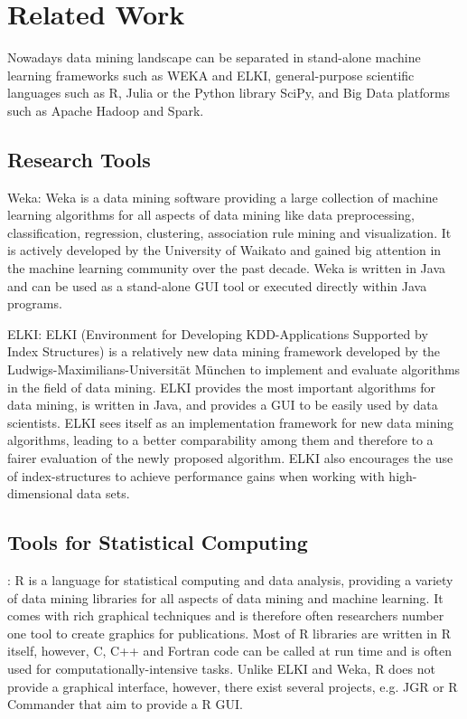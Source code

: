 \chapter{Related Work}\label{chapter:related}

Nowadays data mining landscape can be separated in stand-alone machine learning frameworks such as WEKA and ELKI, general-purpose scientific languages such as R, Julia or the Python library SciPy, and Big Data platforms such as Apache Hadoop and Spark.

\section{Research Tools}
Weka: Weka is a data mining software providing a large collection of machine learning algorithms for all aspects of data mining like data preprocessing, classification, regression, clustering, association rule mining and visualization. It is  actively developed by the University of Waikato and gained big attention in the machine learning community over the past decade. Weka is written in Java and can be used as a stand-alone GUI tool or executed directly within Java programs. 



ELKI: ELKI (Environment for Developing KDD-Applications Supported by Index Structures) is a relatively new data mining framework developed by the Ludwigs-Maximilians-Universität München to implement and evaluate algorithms in the field of data mining. ELKI provides the most important algorithms for data mining, is written in Java, and provides a GUI to be easily used by data scientists.  ELKI sees itself as an implementation framework for new data mining algorithms, leading to a better comparability among them and therefore to a fairer evaluation of the newly proposed algorithm. ELKI also encourages the use of index-structures to achieve performance gains when working with high-dimensional data sets.

\section{Tools for Statistical Computing}

: R is a language for statistical computing and data analysis, providing a variety of data mining libraries for all aspects of data mining and machine learning. It comes with rich graphical techniques and is therefore often researchers number one tool to create graphics for publications. Most of R libraries are written in R itself, however, C, C++ and Fortran code can be called at run time and is often used for computationally-intensive tasks. Unlike ELKI and Weka, R does not provide a graphical interface, however, there exist several projects, e.g. JGR or R Commander that aim to provide a R GUI.


